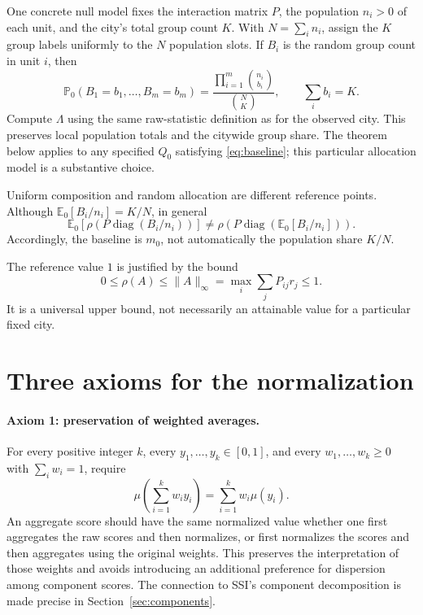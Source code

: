 \documentclass[11pt]{article}
\newcommand{\E}{\mathbb{E}}
\newcommand{\Prob}{\mathbb{P}}
\begin{document}
One concrete null model fixes the interaction matrix $P$, the population $n_i>0$
of each unit, and the city's total group count $K$. With $N=\sum_i n_i$, assign
the $K$ group labels uniformly to the $N$ population slots. If $B_i$ is the
random group count in unit $i$, then
\[
 \Prob_0(B_1=b_1,\ldots,B_m=b_m)
 =\frac{\prod_{i=1}^{m}\binom{n_i}{b_i}}{\binom{N}{K}},
 \qquad \sum_i b_i=K.
\]
Compute $\Lambda$ using the same raw-statistic definition as for the observed
city. This preserves local population totals and the citywide group share.
The theorem below applies to any specified $Q_0$ satisfying
\eqref{eq:baseline}; this particular allocation model is a substantive choice.

Uniform composition and random allocation are different reference points.
Although $\E_0[B_i/n_i]=K/N$, in general
\[
 \E_0\!\left[\rho\!\left(P\operatorname{diag}(B_i/n_i)\right)\right]
 \ne
 \rho\!\left(P\operatorname{diag}(\E_0[B_i/n_i])\right).
\]
Accordingly, the baseline is $m_0$, not automatically the population share $K/N$.

The reference value $1$ is justified by the bound
\[
 0\leq\rho(A)\leq\|A\|_{\infty}
 =\max_i\sum_jP_{ij}r_j\leq1.
\]
It is a universal upper bound, not necessarily an attainable value for a
particular fixed city.

\section{Three axioms for the normalization}

\paragraph{Axiom 1: preservation of weighted averages.}
For every positive integer $k$, every $y_1,\ldots,y_k\in[0,1]$, and every
$w_1,\ldots,w_k\geq0$ with $\sum_iw_i=1$, require
\begin{equation}
 \boxed{\displaystyle
 \mu\!\left(\sum_{i=1}^{k}w_i y_i\right)
 =\sum_{i=1}^{k}w_i\mu(y_i).}
 \label{eq:averaging}
\end{equation}
An aggregate score should have the same normalized value whether one first
aggregates the raw scores and then normalizes, or first normalizes the scores
and then aggregates using the original weights. This preserves the
interpretation of those weights and avoids introducing an additional
preference for dispersion among component scores. The connection to SSI's
component decomposition is made precise in Section~\ref{sec:components}.
\end{document}
